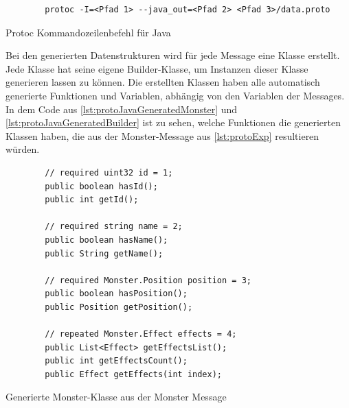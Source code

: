 \begin{listing}[htp]
    \begin{verbatim} 
        protoc -I=<Pfad 1> --java_out=<Pfad 2> <Pfad 3>/data.proto
    \end{verbatim}
    \caption{Protoc Kommandozeilenbefehl für Java\cite{protobufProtocolBufferJava}}
    \label{lst:protocJava}
\end{listing}

Bei den generierten Datenstrukturen wird für jede Message eine Klasse erstellt. Jede Klasse hat seine eigene Builder-Klasse, um Instanzen dieser Klasse generieren lassen zu können. Die erstellten Klassen haben alle automatisch generierte Funktionen und Variablen, abhängig von den Variablen der Messages. In dem Code aus \ref{lst:protoJavaGeneratedMonster} und \ref{lst:protoJavaGeneratedBuilder} ist zu sehen, welche Funktionen die generierten Klassen haben, die aus der Monster-Message aus \ref{lst:protoExp} resultieren würden. 

\begin{listing}[htp]
    \begin{verbatim} 
        // required uint32 id = 1;
        public boolean hasId();
        public int getId();

        // required string name = 2;
        public boolean hasName();
        public String getName();

        // required Monster.Position position = 3;
        public boolean hasPosition();
        public Position getPosition();

        // repeated Monster.Effect effects = 4;
        public List<Effect> getEffectsList();
        public int getEffectsCount();
        public Effect getEffects(int index);
    \end{verbatim}
    \caption{Generierte Monster-Klasse aus der Monster Message}
    \label{lst:protoJavaGeneratedMonster}
\end{listing}


